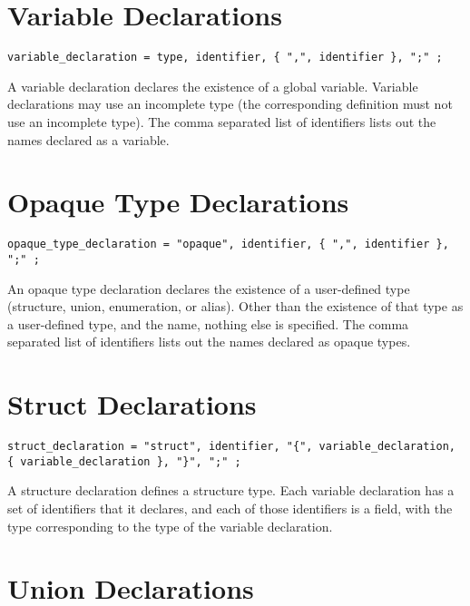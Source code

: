 \documentclass[letterpaper,12pt]{book}
\begin{document}
\section{Variable Declarations}

\begin{lstlisting}[breaklines=true]
variable_declaration = type, identifier, { ",", identifier }, ";" ;
\end{lstlisting}

A variable declaration declares the existence of a global variable. Variable declarations may use an incomplete type (the corresponding definition must not use an incomplete type). The comma separated list of identifiers lists out the names declared as a variable.

\section{Opaque Type Declarations}

\begin{lstlisting}[breaklines=true]
opaque_type_declaration = "opaque", identifier, { ",", identifier }, ";" ;
\end{lstlisting}

An opaque type declaration declares the existence of a user-defined type (structure, union, enumeration, or alias). Other than the existence of that type as a user-defined type, and the name, nothing else is specified. The comma separated list of identifiers lists out the names declared as opaque types.

\section{Struct Declarations}

\begin{lstlisting}[breaklines=true]
struct_declaration = "struct", identifier, "{", variable_declaration, { variable_declaration }, "}", ";" ;
\end{lstlisting}

A structure declaration defines a structure type. Each variable declaration has a set of identifiers that it declares, and each of those identifiers is a field, with the type corresponding to the type of the variable declaration.

\section{Union Declarations}
\end{document}
